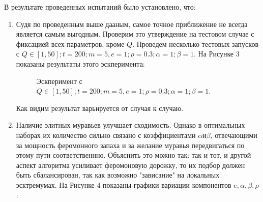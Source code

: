 \documentclass[12pt]{report}
\begin{document}
В результате проведенных испытаний было установлено, что:\\
\begin{enumerate}
	\item Судя по проведенным выше дааным, самое точное приближение не всегда является самым выгодным. Проверим это утверждение на тестовом случае с фиксацией всех параметров, кроме $Q$. Проведем несколько тестовых запусков с $Q \in [1, 50]; t = 200; m = 5, e = 1; \rho = 0.3; \alpha = 1; \beta = 1.$ На Рисунке 3 показаны результаты этого эскперимента:\\
	\begin{figure}[h!]
		\caption{Эскперимент с $Q \in [1, 50]; t = 200; m = 5, e = 1; \rho = 0.3; \alpha = 1; \beta = 1.$}
	\end{figure}
	Как видим результат варьируется от случая к случаю.
	\item Наличие элитных муравьев улучшает сходимость. Однако в оптимальных наборах их количество сильно связано с коэффициентами $\alpha и \beta$, отвечающими за мощность феромонного запаха и за желание муравья передвигаться по этому пути соответственнно. Объяснить это можно так: так и тот, и другой аспект алгоритма усиливает феромоновую дорожку, то их подбор должен быть сбалансирован, так как возможно "зависание" на локальных эсктремумах. На Рисунке 4 показаны графики вариации компонентов $e, \alpha, \beta, \rho$:
	\clearpage
	\newpage
	\begin{figure}[h]

\end{figure}
\end{enumerate}
\end{document}

